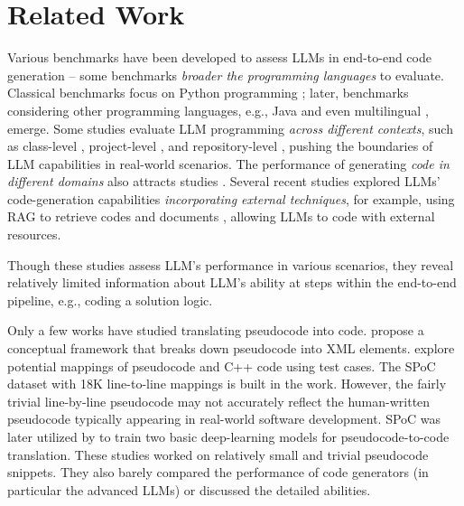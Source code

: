 \section{Related Work}
\label{sec:related-work}


Various benchmarks have been developed to assess LLMs in end-to-end code generation -- %
some benchmarks {\textit{broader the programming languages}} to evaluate. Classical benchmarks focus on Python programming \cite{humaneval, mbpp}; later, benchmarks considering other programming languages, e.g., Java \cite{JavaBench} and even multilingual \cite{humanevalx}, emerge. %
Some studies evaluate LLM programming {\textit{across different contexts}}, %
such as class-level \cite{classeval}, project-level \cite{deveval}, and repository-level \cite{repocoder, repoeval}, pushing the boundaries of LLM capabilities in real-world scenarios.
The performance of generating \textit{{code in different domains}} also attracts studies \cite{domaineval}. %
Several recent studies explored LLMs' code-generation capabilities {\textit{incorporating external techniques}}, for example, using RAG to retrieve codes \cite{ase24retrieval_repo, codesearchallyouneed_hu} and documents \cite{docragarxiv, docragccwan}, allowing LLMs to code with external resources.

Though these studies assess LLM's performance in various scenarios, they reveal relatively limited information about LLM's ability at steps within the end-to-end pipeline, e.g., coding a solution logic.

Only a few works have studied translating pseudocode into code. \citet{Dir17} propose a conceptual framework that breaks down pseudocode into XML elements. \citet{Kul19} explore potential mappings of pseudocode and C++ code using test cases. The SPoC dataset with 18K line-to-line mappings is built in the work. However, the fairly trivial line-by-line pseudocode may not accurately reflect the human-written pseudocode typically appearing in real-world software development. SPoC was later utilized by \citet{Ach22} to train two basic deep-learning models for pseudocode-to-code translation.
These studies worked on relatively small and trivial pseudocode snippets. They also barely compared the performance of code generators (in particular the advanced LLMs) or discussed the detailed abilities. %